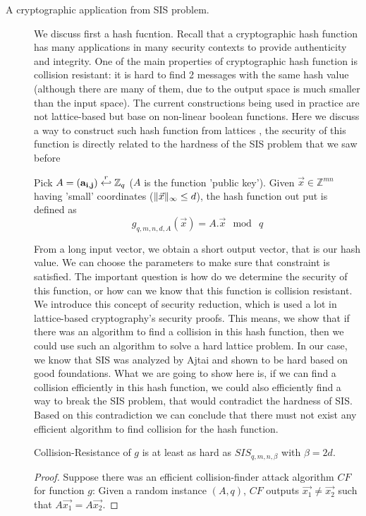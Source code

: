 \begin{description}
    \item [A cryptographic application from SIS problem.] We discuss first a
        hash fucntion. Recall that a cryptographic hash function has many
        applications in many security contexts to provide authenticity and
        integrity. One of the main properties of cryptographic hash function is
        collision resistant: it is hard to find 2 messages with the same hash
        value (although there are many of them, due to the output space is much
        smaller than the input space). The current constructions being used in
        practice are not lattice-based but base on non-linear boolean functions.
        Here we discuss a way to construct such hash function from lattices
        , the security of this function is directly related to the hardness of
        the SIS problem that we saw before
        \begin{definition}
             Pick $A=(\mathbf{a_{i,j}}) \stackrel{r}{\hookleftarrow}
            \mathbb{Z}_q$ ($A$ is the function 'public key'). Given
            $\vec{x} \in \mathbb{Z}^{mn}$ having 'small' coordinates
            ($\Vert \vec{x} \Vert_{\infty} \leq d$), the hash function out put is defined
            as
            \[
                g_{q,m,n,d,A}(\vec{x}) = A . \vec{x} \mod \ q
            \]
            \label{def:Ajtai's Hash Function}
        \end{definition}
        From a long input vector, we obtain a short output vector, that is our
        hash value. We can choose the parameters to make sure that constraint is
        satisfied. The important question is how do we determine the security of
        this function, or how can we know that this function is collision
        resistant. We introduce this concept of security reduction, which is
        used a lot in lattice-based cryptography's security proofs. This means,
        we show that if there was an algorithm to find a collision in this hash
        function, then we could use such an algorithm to solve a hard lattice
        problem. In our case, we know that SIS was analyzed by Ajtai and shown
        to be hard based on good foundations. What we are going to show here is,
        if we can find a collision efficiently in this hash function, we could
        also efficiently find a way to break the SIS problem, that would
        contradict the hardness of SIS. Based on this contradiction we can
        conclude that there must not exist any efficient algorithm to find
        collision for the hash function.
        \begin{theorem}
            Collision-Resistance of $g$ is at least as hard as
            $SIS_{q,m,n,\beta}$ with $\beta = 2d$.
            \label{the:ajtai hash}
        \end{theorem}
        \begin{proof}
            Suppose there was an efficient
            collision-finder attack algorithm $CF$ for function $g$: Given a random
            instance $(A,q)$, $CF$ outputs $\vec{x_1} \neq \vec{x_2}$ such that
            $A\vec{x_1} = A\vec{x_2}$.


\end{proof}
\end{description}
